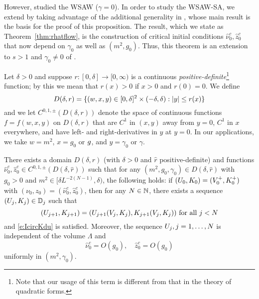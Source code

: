 However, \cite{BBS-saw4-log} studied the WSAW ($\gamma = 0$). In order to study
the WSAW-SA, we extend \cite[Proposition~\ref{log-prop:flow-flow}]{BBS-saw4-log}
by taking advantage of the additional generality in \cite{BBS-rg-flow}, whose
main result is the basis for the proof of this proposition. The result, which we
state as Theorem~\ref{thm:rhatflow}, is the
construction of critical initial conditions $\hat\nu_0^c, \hat z_0^c$ that now
depend on $\gamma_0$ as well as $(m^2, g_0)$. Thus, this theorem is an extension
to $s > 1$ and $\gamma_0 \ne 0$ of \cite[Proposition~\ref{log-prop:flow-flow}]{BBS-saw4-log}.

Let $\delta > 0$ and suppose $r : [0, \delta] \to [0, \infty)$
is a continuous \emph{positive-definite}\footnote{Note that our usage of this term is
different from that in the theory of quadratic forms.} function; by this we
mean that $r(x) > 0$ if $x > 0$ and $r(0) = 0$.
We define
\begin{equation}
\lbeq{Ddef}
D(\delta, r)
	=
\{ (w, x, y) \in [0, \delta]^2 \times (-\delta, \delta) : |y| \leq r(x) \}
\end{equation}
and we let $C^{0,1,\pm}(D(\delta, r))$ denote the space of continuous functions
$f = f(w, x, y)$ on $D(\delta, r)$
that are $C^1$ in $(x, y)$ away from $y = 0$, $C^1$ in $x$ everywhere,
and have left- and right-derivatives in $y$ at $y = 0$.
In our applications, we take $w = m^2$, $x = g_0$ or $g$,
and $y = \gamma_0$ or $\gamma$.

\begin{theorem}
\label{thm:rhatflow}
There exists a domain $D(\delta, \hat r)$ (with $\delta > 0$ and $\hat r$
positive-definite) and functions $\hat\nu_0^c, \hat z_0^c \in C^{0,1,\pm}(D(\delta, \hat r))$
such that for any $(m^2, g_0, \gamma_0) \in D(\delta, \hat r)$
with $g_0 > 0$ and $m^2 \in [\delta L^{-2 (N - 1)}, \delta)$, the following holds:
if $(U_0, K_0) = (V^+_0, K^+_0)$ with $(\nu_0, z_0) = (\hat\nu_0^c, \hat z_0^c)$,
then for any $N \in {\mathbb N}$, there exists a sequence $(U_j, K_j) \in \mathbb{D}_j$ such that
\begin{equation}
\label{e:VjKjDj-hat}
(U_{j+1},K_{j+1})
	=
(U_{j+1}(V_j, K_j), K_{j+1}(V_j, K_j)) \text{ for all } j < N
\end{equation}
and \eqref{e:IcircKdu} is satisfied.
Moreover, the sequence $U_j, j = 1, \ldots, N$ is independent of the volume $\Lambda$ and
\begin{equation}
\label{e:hat-est}
\hat\nu_0^c = O(g_0),
\quad
\hat z_0^c = O(g_0)
\end{equation}
uniformly in $(m^2, \gamma_0)$.
\end{theorem}

